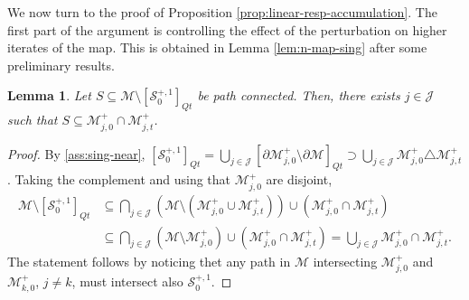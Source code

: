 \documentclass{amsart}
\numberwithin{equation}{section}
\newtheorem{lemma}[theorem]{Lemma}
\newcommand\cJ{{\mathcal J}}
\newcommand\cM{{\mathcal M}}
\newcommand\cS{{\mathcal S}}
\begin{document}
We now turn to the proof of Proposition \ref{prop:linear-resp-accumulation}. The first part of the argument is controlling the effect of the perturbation on higher iterates of the map. This is obtained in Lemma \ref{lem:n-map-sing} after some preliminary results.

\begin{lemma}\label{lem:path-connected}
Let \(S \subseteq \cM \setminus [\cS_0^{+,1}]_{Qt}\) be path connected. Then, there exists \(j \in \cJ\) such that \(S \subseteq \cM_{j,0}^+ \cap \cM_{j,t}^+\).
\end{lemma}
\begin{proof}
By \ref{ass:sing-near}, \( [\cS_{0}^{+,1} ]_{Q t} = \bigcup_{j \in \cJ} [\partial \cM_{j,0}^+ \setminus \partial \cM]_{Q t} \supset \bigcup_{j \in \cJ} \cM_{j,0}^+ \triangle \cM_{j,t}^+\). Taking the complement and using that \(\cM_{j,0}^{+}\) are disjoint,
\[
\begin{split}
 \cM \setminus [\cS_{0}^{+,1}]_{Q t} &\subseteq \bigcap_{j\in \cJ} (\cM \setminus ( \cM_{j,0}^+ \cup \cM_{j,t}^+)) \cup \left( \cM_{j,0}^+ \cap \cM_{j,t}^+\right) \\
&\subseteq \bigcap_{j\in \cJ} (\cM \setminus\cM_{j,0}^+ )\cup \left( \cM_{j,0}^+ \cap \cM_{j,t}^+\right) = \bigcup_{j \in \cJ} \cM_{j,0}^+ \cap \cM_{j,t}^+.
\end{split}
\]
The statement follows by noticing thet any path in \(\cM\) intersecting \(\cM_{j,0}^+\) and \(\cM_{k,0}^+\), \(j \neq k\), must intersect also \(\cS_0^{+,1}\).
\end{proof}
\end{document}
